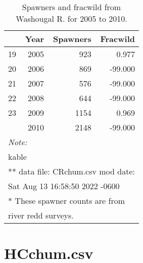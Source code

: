 \documentclass[
  letterpaper,
  oneside]{scrbook}
\begin{document}
\newpage

\hypertarget{tbl-appA2}{}
\begin{table}
\caption{\label{tbl-appA2}Spawners and fracwild from Washougal R. for 2005 to 2010. }\tabularnewline

\centering
\begin{tabular}[t]{lrrr}
\toprule
  & Year & Spawners & Fracwild\\
\midrule
19 & 2005 & 923 & 0.977\\
20 & 2006 & 869 & -99.000\\
21 & 2007 & 576 & -99.000\\
22 & 2008 & 644 & -99.000\\
23 & 2009 & 1154 & 0.969\\
\addlinespace
24 & 2010 & 2148 & -99.000\\
\bottomrule
\multicolumn{4}{l}{\rule{0pt}{1em}\textit{Note: }}\\
\multicolumn{4}{l}{\rule{0pt}{1em}kable}\\
\multicolumn{4}{l}{\textsuperscript{} ** data file: CRchum.csv mod date:}\\
\multicolumn{4}{l}{Sat Aug 13 16:58:50 2022 -0600}\\
\multicolumn{4}{l}{\textsuperscript{} * These spawner counts are from}\\
\multicolumn{4}{l}{river redd surveys.}\\
\end{tabular}
\end{table}

\newpage

\hypertarget{hcchum.csv}{%
\chapter{HCchum.csv}\label{hcchum.csv}}
\end{document}

